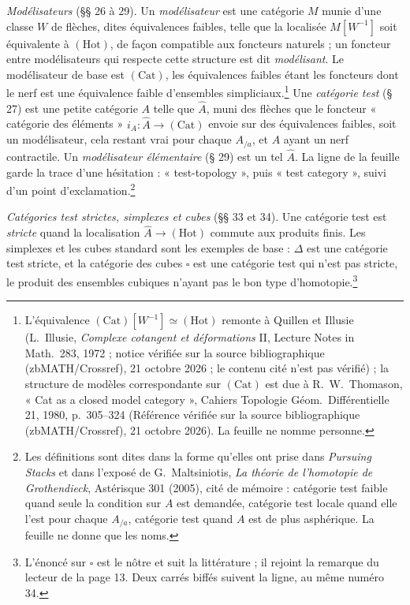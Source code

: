 \documentclass[11pt,a4paper]{article}
\begin{document}
\emph{Modélisateurs} (§§ 26 à 29). Un \emph{modélisateur} est une catégorie
$M$ munie d'une classe $W$ de flèches, dites équivalences faibles, telle que
la localisée $M[W^{-1}]$ soit équivalente à $(\mathrm{Hot})$, de façon
compatible aux foncteurs naturels ; un foncteur entre modélisateurs qui
respecte cette structure est dit \emph{modélisant}. Le modélisateur de base est
$(\mathrm{Cat})$, les équivalences faibles étant les foncteurs dont le nerf
est une équivalence faible d'ensembles simpliciaux.\footnote{L'équivalence
$(\mathrm{Cat})[W^{-1}] \simeq (\mathrm{Hot})$ remonte à Quillen et Illusie (L.~Illusie, \emph{Complexe cotangent et déformations} II, Lecture Notes in Math.\ 283, 1972 ; notice vérifiée sur la source bibliographique (zbMATH/Crossref), 21 octobre 2026 ; le contenu cité n'est pas vérifié) ; la structure de modèles correspondante sur $(\mathrm{Cat})$ est due à R.~W.~Thomason, « Cat as a closed model category », Cahiers Topologie Géom.\ Différentielle 21, 1980, p.~305--324 (Référence vérifiée sur la source bibliographique (zbMATH/Crossref), 21 octobre 2026). La feuille ne nomme personne.} Une \emph{catégorie test} (§ 27) est une petite catégorie $A$
telle que $\widehat{A}$, muni des flèches que le foncteur « catégorie des
éléments » $i_{A} : \widehat{A} \to (\mathrm{Cat})$ envoie sur des
équivalences faibles, soit un modélisateur, cela restant vrai pour chaque
$A_{/a}$, et $A$ ayant un nerf contractile. Un \emph{modélisateur
élémentaire} (§ 29) est un tel $\widehat{A}$. La ligne de la feuille garde
la trace d'une hésitation : « test-topology », puis « test category », suivi
d'un point d'exclamation.\footnote{Les définitions sont dites dans la forme
qu'elles ont prise dans \emph{Pursuing Stacks} et dans l'exposé de
G.~Maltsiniotis, \emph{La théorie de l'homotopie de Grothendieck}, Astérisque
301 (2005), cité de mémoire : catégorie test faible quand seule la condition
sur $A$ est demandée, catégorie test locale quand elle l'est pour chaque
$A_{/a}$, catégorie test quand $A$ est de plus asphérique. La feuille ne donne
que les noms.}

\emph{Catégories test strictes, simplexes et cubes} (§§ 33 et 34). Une
catégorie test est \emph{stricte} quand la localisation
$\widehat{A} \to (\mathrm{Hot})$ commute aux produits finis. Les
simplexes et les cubes standard sont les exemples de base : $\Delta$ est une
catégorie test stricte, et la catégorie des cubes $\square$ est une catégorie
test qui n'est pas stricte, le produit des ensembles cubiques n'ayant pas le
bon type d'homotopie.\footnote{L'énoncé sur $\square$ est le nôtre et suit
la littérature ; il rejoint la remarque du lecteur de la page 13. Deux carrés
biffés suivent la ligne, au même numéro 34.}
\end{document}
